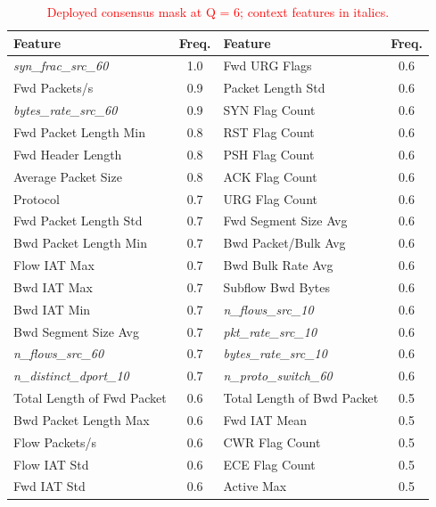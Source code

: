 \documentclass[conference]{IEEEtran}
\begin{document}
\begin{table}[!t]
\centering
\scriptsize
\caption{\textcolor{red}{Deployed consensus mask at Q = 6; context features in italics.}}
\label{tab:selected_features}
\color{red}
\setlength{\tabcolsep}{2.5pt}
\renewcommand{\arraystretch}{1.02}
\begin{tabular}{>{\raggedright\arraybackslash}p{3.0cm}c >{\raggedright\arraybackslash}p{3.0cm}c}
\hline\toprule
Feature & Freq. & Feature & Freq. \\
\hline\toprule
\textit{syn\_frac\_src\_60} & 1.0 & Fwd URG Flags & 0.6 \\
Fwd Packets/\allowbreak s & 0.9 & Packet Length Std & 0.6 \\
\textit{bytes\_rate\_src\_60} & 0.9 & SYN Flag Count & 0.6 \\
Fwd Packet Length Min & 0.8 & RST Flag Count & 0.6 \\
Fwd Header Length & 0.8 & PSH Flag Count & 0.6 \\
Average Packet Size & 0.8 & ACK Flag Count & 0.6 \\
Protocol & 0.7 & URG Flag Count & 0.6 \\
Fwd Packet Length Std & 0.7 & Fwd Segment Size Avg & 0.6 \\
Bwd Packet Length Min & 0.7 & Bwd Packet/\allowbreak Bulk Avg & 0.6 \\
Flow IAT Max & 0.7 & Bwd Bulk Rate Avg & 0.6 \\
Bwd IAT Max & 0.7 & Subflow Bwd Bytes & 0.6 \\
Bwd IAT Min & 0.7 & \textit{n\_flows\_src\_10} & 0.6 \\
Bwd Segment Size Avg & 0.7 & \textit{pkt\_rate\_src\_10} & 0.6 \\
\textit{n\_flows\_src\_60} & 0.7 & \textit{bytes\_rate\_src\_10} & 0.6 \\
\textit{n\_distinct\_dport\_10} & 0.7 & \textit{n\_proto\_switch\_60} & 0.6 \\
Total Length of Fwd Packet & 0.6 & Total Length of Bwd Packet & 0.5 \\
Bwd Packet Length Max & 0.6 & Fwd IAT Mean & 0.5 \\
Flow Packets/\allowbreak s & 0.6 & CWR Flag Count & 0.5 \\
Flow IAT Std & 0.6 & ECE Flag Count & 0.5 \\
Fwd IAT Std & 0.6 & Active Max & 0.5 \\
\hline\toprule
\end{tabular}
\end{table}
\end{document}
